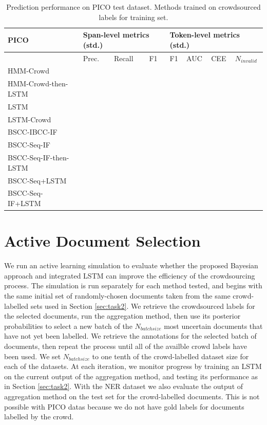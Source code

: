 \begin{table}
\begin{tabularx}{\textwidth}{| l | X | X | X | X | X | X | X |}
\hline
PICO & \multicolumn{3}{|l|}{Span-level metrics (std.)}                          & \multicolumn{4}{|l|}{Token-level metrics (std.)} \\ \hline 
& Prec. & Recall & F1 & F1 & AUC & CEE & $N_{invalid}$ \\ \hline
HMM-Crowd & \\ 
HMM-Crowd-then-LSTM &\\ 
LSTM & \\ 
LSTM-Crowd & \\ \hline
BSCC-IBCC-IF & \\
BSCC-Seq-IF & \\ \hline
BSCC-Seq-IF-then-LSTM &\\
BSCC-Seq+LSTM &\\
BSCC-Seq-IF+LSTM &\\
\hline
\end{tabularx}
\caption{Prediction performance on PICO test dataset. Methods trained on crowdsourced labels for training set.}
\label{tab:prediction_results_pico}
\end{table}


\section{Active Document Selection}

We run an active learning simulation to evaluate whether the proposed Bayesian approach and integrated LSTM
can improve the efficiency of the crowdsourcing process. 
The simulation is run separately for each method tested, and begins with the same initial set of randomly-chosen
documents taken from the same crowd-labelled sets used in Section \ref{sec:task2}.
We retrieve the crowdsourced labels for the selected documents, run the aggregation method,
then use its posterior probabilities to select a new batch of the $N_{batchsize}$ most uncertain documents that have not yet been labelled. 
We retrieve the annotations for the selected batch of documents, then repeat the process until
all of the availble crowd labels have been used.
We set $N_{batchsize}$ to one tenth of the crowd-labelled dataset size for each of the datasets. At each iteration,
we monitor progress by training an LSTM on the current output of the aggregation method, 
and testing its performance as in Section \ref{sec:task2}. 
With the NER dataset we also evaluate the output of aggregation method on the test set for the crowd-labelled documents. 
This is not possible with PICO datas because we do not have gold labels for documents labelled by the crowd.

